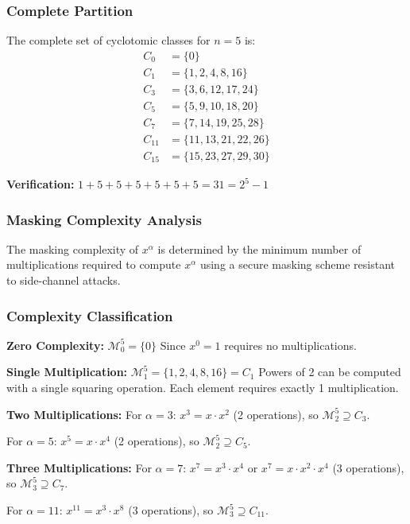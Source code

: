 \documentclass{article}
\begin{document}
\subsubsection*{Complete Partition}

The complete set of cyclotomic classes for $n=5$ is:
\begin{align*}
C_0 &= \{0\} \\
C_1 &= \{1, 2, 4, 8, 16\} \\
C_3 &= \{3, 6, 12, 17, 24\} \\
C_5 &= \{5, 9, 10, 18, 20\} \\
C_7 &= \{7, 14, 19, 25, 28\} \\
C_{11} &= \{11, 13, 21, 22, 26\} \\
C_{15} &= \{15, 23, 27, 29, 30\}
\end{align*}

\textbf{Verification:} $1 + 5 + 5 + 5 + 5 + 5 + 5 = 31 = 2^5 - 1$ \checkmark

\subsubsection*{Masking Complexity Analysis}

The masking complexity of $x^\alpha$ is determined by the minimum number of multiplications required to compute $x^\alpha$ using a secure masking scheme resistant to side-channel attacks.

\subsubsection*{Complexity Classification}

\textbf{Zero Complexity:}
$\mathcal{M}_0^5 = \{0\}$
Since $x^0 = 1$ requires no multiplications.

\textbf{Single Multiplication:}
$\mathcal{M}_1^5 = \{1, 2, 4, 8, 16\} = C_1$
Powers of 2 can be computed with a single squaring operation. Each element requires exactly 1 multiplication.

\textbf{Two Multiplications:}
For $\alpha = 3$: $x^3 = x \cdot x^2$ (2 operations), so $\mathcal{M}_2^5 \supseteq C_3$.

For $\alpha = 5$: $x^5 = x \cdot x^4$ (2 operations), so $\mathcal{M}_2^5 \supseteq C_5$.

\textbf{Three Multiplications:}
For $\alpha = 7$: $x^7 = x^3 \cdot x^4$ or $x^7 = x \cdot x^2 \cdot x^4$ (3 operations), so $\mathcal{M}_3^5 \supseteq C_7$.

For $\alpha = 11$: $x^{11} = x^3 \cdot x^8$ (3 operations), so $\mathcal{M}_3^5 \supseteq C_{11}$.
\end{document}
